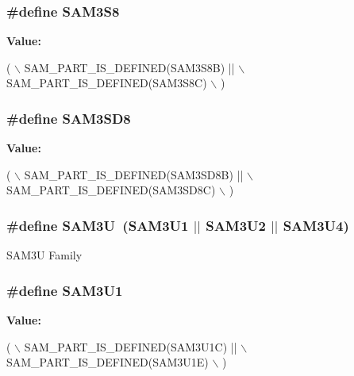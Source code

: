 \subsubsection[{S\+A\+M3\+S8}]{\setlength{\rightskip}{0pt plus 5cm}\#define S\+A\+M3\+S8}\label{group__sam__part__macros__group_gaea8f1cca303520385d12110ad8e8bafe}
{\bfseries Value\+:}
\begin{DoxyCode}
( \(\backslash\)
        SAM\_PART\_IS\_DEFINED(SAM3S8B) || \(\backslash\)
        SAM\_PART\_IS\_DEFINED(SAM3S8C) \(\backslash\)
        )
\end{DoxyCode}
\hypertarget{group__sam__part__macros__group_ga9f16069247b2e38ddb0bcaa912750a4f}{}
\subsubsection[{S\+A\+M3\+S\+D8}]{\setlength{\rightskip}{0pt plus 5cm}\#define S\+A\+M3\+S\+D8}\label{group__sam__part__macros__group_ga9f16069247b2e38ddb0bcaa912750a4f}
{\bfseries Value\+:}
\begin{DoxyCode}
( \(\backslash\)
        SAM\_PART\_IS\_DEFINED(SAM3SD8B) || \(\backslash\)
        SAM\_PART\_IS\_DEFINED(SAM3SD8C) \(\backslash\)
        )
\end{DoxyCode}
\hypertarget{group__sam__part__macros__group_ga987abac1ef39b0b447b8b11419942476}{}
\subsubsection[{S\+A\+M3\+U}]{\setlength{\rightskip}{0pt plus 5cm}\#define S\+A\+M3\+U~(S\+A\+M3\+U1 $\vert$$\vert$ S\+A\+M3\+U2 $\vert$$\vert$ S\+A\+M3\+U4)}\label{group__sam__part__macros__group_ga987abac1ef39b0b447b8b11419942476}
S\+A\+M3\+U Family \hypertarget{group__sam__part__macros__group_gae39c5d03b1af93b2864e5f72908a0ff3}{}
\subsubsection[{S\+A\+M3\+U1}]{\setlength{\rightskip}{0pt plus 5cm}\#define S\+A\+M3\+U1}\label{group__sam__part__macros__group_gae39c5d03b1af93b2864e5f72908a0ff3}
{\bfseries Value\+:}
\begin{DoxyCode}
( \(\backslash\)
        SAM\_PART\_IS\_DEFINED(SAM3U1C) || \(\backslash\)
        SAM\_PART\_IS\_DEFINED(SAM3U1E) \(\backslash\)
        )
\end{DoxyCode}
\hypertarget{group__sam__part__macros__group_ga0feb884f39921517436f269c86914cb0}{}
